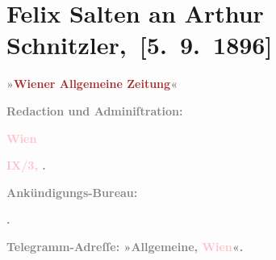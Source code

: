 

\renewcommand{\erwaehntePersonen}{Personen: Ferdinand Raimund, Julian Sternberg}
\renewcommand{\erwaehnteInstitutionen}{Institutionen: Südbahnstrecke, Wiener Allgemeine Zeitung}
\renewcommand{\erwaehnteOrte}{Orte: Raimund-Theater, Schulerstraße, Universitätsstraße, Wien}
\renewcommand{\erwaehnteWerke}{Werke: Das Mädchen aus der Feenwelt oder Der Bauer als Millionär}
\section[ Felix Salten an Arthur Schnitzler, {[}5. 9. 1896{]}]{Felix Salten an Arthur Schnitzler, {[}5. 9. 1896{]}}
\nopagebreak{}
\rehead{ }\normalsize\beginnumbering{}
\toendnotes[C]{\smallbreak\pagebreak[2]}
\toendnotes[C]{\smallbreak}
\pstart
           \noindent{}{\pb}\textcolor{gray}{\textbf{\textbf{»\textcolor{brown}{Wiener Allgemeine
                        Zeitung}{}\ledrightnote{\textcolor{brown}{Wiener Allgemeine Zeitung}}«}}}\pend
           
\pstart
           \textcolor{gray}{\textbf{Redaction und Adminiſtration:}}\pend
           
\pstart
           \textcolor{gray}{\textbf{\textcolor{pink}{Wien}{}\ledrightnote{\textcolor{pink}{Wien}}}}\pend
           
\pstart
           \textcolor{gray}{\textbf{\textcolor{pink}{\textbf{IX}/3,{ }\textbf{}}{}\ledrightnote{\textcolor{pink}{Universitätsstraße}}\textbf{.}}}\pend
           
\pstart
           \textcolor{gray}{\textbf{Ankündigungs-Bureau:}}\pend
           
\pstart
           \textcolor{gray}{\textbf{\textbf{\textcolor{pink}{}{}\ledrightnote{\textcolor{pink}{Schulerstraße}}.
                     }}}\pend
           
\pstart
           \textcolor{gray}{\textbf{Telegramm-Adreſſe: »Allgemeine, \textcolor{pink}{Wien}{}\ledrightnote{\textcolor{pink}{Wien}}«.}}\pend
           
